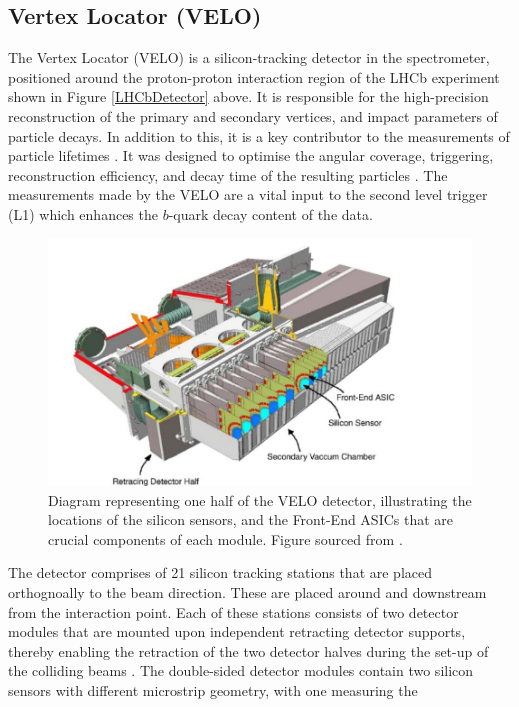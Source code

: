 \subsection{Vertex Locator (VELO)}\label{VELO}
The Vertex Locator (VELO) is a silicon-tracking detector in the spectrometer, positioned around the proton-proton interaction region of the LHCb experiment shown in Figure \ref{LHCbDetector} above. It is responsible for the high-precision reconstruction of the primary and secondary vertices, and impact parameters of particle decays. In addition to this, it is a key
contributor to the measurements of particle lifetimes \cite{Kopciewicz_2022}. It was designed to optimise the angular coverage, triggering, reconstruction efficiency, and decay time of the resulting particles \cite{Aaij_2014}. The measurements made by the VELO are a vital input to the second level trigger (L1) which enhances the $b$-quark decay content of the data.\\
\begin{figure}[H]
    \centering
    \includegraphics[scale=0.5]{VELOModule.jpg}
    \caption{Diagram representing one half of the VELO detector, illustrating the locations of the silicon sensors, and the Front-End ASICs that are crucial components of each module. Figure sourced from \cite{EKLUND200572}.}
    \label{VELOModule}
\end{figure}
The detector comprises of 21 silicon tracking stations that are placed orthognoally to the beam direction. These are placed around and downstream from the interaction point. Each of these stations consists of two detector modules that are mounted upon independent retracting detector supports, thereby enabling the retraction of the two detector halves during the set-up of the colliding beams \cite{EKLUND200572}. The double-sided detector modules contain two silicon sensors with different microstrip geometry, with one measuring the
